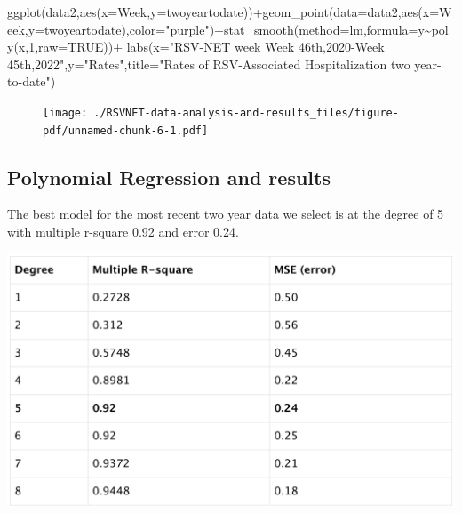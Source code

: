 \documentclass[
  letterpaper,
  DIV=11,
  numbers=noendperiod]{scrreport}
\newenvironment{Shaded}{\begin{snugshade}}{\end{snugshade}}
\newcommand{\AttributeTok}[1]{\textcolor[rgb]{0.40,0.45,0.13}{#1}}
\newcommand{\ConstantTok}[1]{\textcolor[rgb]{0.56,0.35,0.01}{#1}}
\newcommand{\DecValTok}[1]{\textcolor[rgb]{0.68,0.00,0.00}{#1}}
\newcommand{\FunctionTok}[1]{\textcolor[rgb]{0.28,0.35,0.67}{#1}}
\newcommand{\NormalTok}[1]{\textcolor[rgb]{0.00,0.23,0.31}{#1}}
\newcommand{\SpecialCharTok}[1]{\textcolor[rgb]{0.37,0.37,0.37}{#1}}
\newcommand{\StringTok}[1]{\textcolor[rgb]{0.13,0.47,0.30}{#1}}
\begin{document}
\begin{Shaded}
\begin{Highlighting}[]
\FunctionTok{ggplot}\NormalTok{(data2,}\FunctionTok{aes}\NormalTok{(}\AttributeTok{x=}\NormalTok{Week,}\AttributeTok{y=}\NormalTok{twoyeartodate))}\SpecialCharTok{+}\FunctionTok{geom\_point}\NormalTok{(}\AttributeTok{data=}\NormalTok{data2,}\FunctionTok{aes}\NormalTok{(}\AttributeTok{x=}\NormalTok{Week,}\AttributeTok{y=}\NormalTok{twoyeartodate),}\AttributeTok{color=}\StringTok{"purple"}\NormalTok{)}\SpecialCharTok{+}\FunctionTok{stat\_smooth}\NormalTok{(}\AttributeTok{method=}\NormalTok{lm,}\AttributeTok{formula=}\NormalTok{y}\SpecialCharTok{\textasciitilde{}}\FunctionTok{poly}\NormalTok{(x,}\DecValTok{1}\NormalTok{,}\AttributeTok{raw=}\ConstantTok{TRUE}\NormalTok{))}\SpecialCharTok{+}
  \FunctionTok{labs}\NormalTok{(}\AttributeTok{x=}\StringTok{"RSV{-}NET week Week 46th,2020{-}Week 45th,2022"}\NormalTok{,}\AttributeTok{y=}\StringTok{"Rates"}\NormalTok{,}\AttributeTok{title=}\StringTok{"Rates of RSV{-}Associated Hospitalization two year{-}to{-}date"}\NormalTok{)}
\end{Highlighting}
\end{Shaded}

\begin{figure}[H]

{\centering \texttt{[image: ./RSVNET-data-analysis-and-results\_files/figure-pdf/unnamed-chunk-6-1.pdf]}

}

\end{figure}

\hypertarget{polynomial-regression-and-results-1}{%
\subsection{Polynomial Regression and
results}\label{polynomial-regression-and-results-1}}

The best model for the most recent two year data we select is at the
degree of 5 with multiple r-square 0.92 and error 0.24.

\includegraphics[width=6.17708in,height=\textheight]{./images/paste-9BB97AC3.png}
\end{document}
